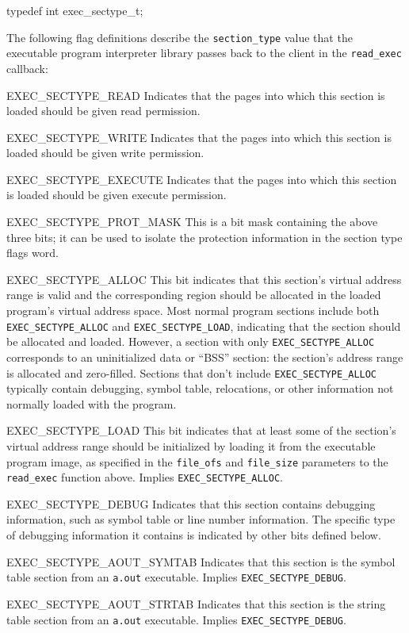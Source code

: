 \label{exec-sectype}
\begin{apisyn}

	typedef int exec_sectype_t;
\end{apisyn}
\begin{apidesc}
	The following flag definitions
	describe the \texttt{section_type} value
	that the executable program interpreter library
	passes back to the client in the \texttt{read_exec} callback:
	\begin{icsymlist}
	\item[EXEC_SECTYPE_READ]
		Indicates that the pages into which this section is loaded
		should be given read permission.
	\item[EXEC_SECTYPE_WRITE]
		Indicates that the pages into which this section is loaded
		should be given write permission.
	\item[EXEC_SECTYPE_EXECUTE]
		Indicates that the pages into which this section is loaded
		should be given execute permission.
	\item[EXEC_SECTYPE_PROT_MASK]
		This is a bit mask containing the above three bits;
		it can be used to isolate the protection information
		in the section type flags word.
	\item[EXEC_SECTYPE_ALLOC]
		This bit indicates that this section's virtual address range
		is valid and the corresponding region should be allocated
		in the loaded program's virtual address space.
		Most normal program sections
		include both \texttt{EXEC_SECTYPE_ALLOC}
		and \texttt{EXEC_SECTYPE_LOAD},
		indicating that the section should be allocated and loaded.
		However, a section with only \texttt{EXEC_SECTYPE_ALLOC}
		corresponds to an uninitialized data or ``BSS'' section:
		the section's address range is allocated and zero-filled.
		Sections that don't include \texttt{EXEC_SECTYPE_ALLOC}
		typically contain debugging, symbol table, relocations,
		or other information not normally loaded with the program.
	\item[EXEC_SECTYPE_LOAD]
		This bit indicates that
		at least some of the section's virtual address range
		should be initialized by loading it
		from the executable program image,
		as specified in the \texttt{file_ofs} and \texttt{file_size}
		parameters to the \texttt{read_exec} function above.
		Implies \texttt{EXEC_SECTYPE_ALLOC}.
	\item[EXEC_SECTYPE_DEBUG]
		Indicates that this section contains debugging information,
		such as symbol table or line number information.
		The specific type of debugging information it contains
		is indicated by other bits defined below.
	\item[EXEC_SECTYPE_AOUT_SYMTAB]
		Indicates that this section
		is the symbol table section from an \texttt{a.out} executable.
		Implies \texttt{EXEC_SECTYPE_DEBUG}.
	\item[EXEC_SECTYPE_AOUT_STRTAB]
		Indicates that this section
		is the string table section from an \texttt{a.out} executable.
		Implies \texttt{EXEC_SECTYPE_DEBUG}.
	\end{icsymlist}
\end{apidesc}

